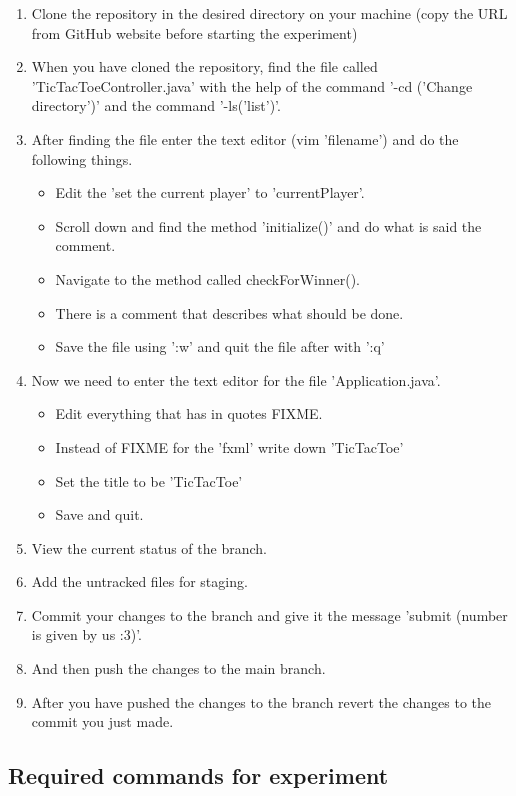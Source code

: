 \documentclass[]{report}
\begin{document}
	\begin{enumerate}[leftmargin=*]
		\item Clone the repository in the desired directory on your machine (copy the URL from GitHub website before starting the experiment)
		\item When you have cloned the repository, find the file called 'TicTacToeController.java' with the help of the command '-cd ('Change directory')' and the command '-ls('list')'.
		\item After finding the file enter the text editor (vim 'filename') and do the following things.
				\begin{itemize}
					\item Edit the 'set the current player' to 'currentPlayer'.
					\item Scroll down and find the method 'initialize()' and do what is said the comment.
					\item Navigate to the method called checkForWinner().
					\item There is a comment that describes what should be done.
					\item Save the file using ':w' and quit the file after with ':q'
				\end{itemize}
			\item Now we need to enter the text editor for the file 'Application.java'.
			\begin{itemize}
				\item Edit everything that has in quotes FIXME.
				\item Instead of FIXME for the 'fxml' write down 'TicTacToe'
				\item Set the title to be 'TicTacToe'
				\item Save and quit.
			\end{itemize}
		\item View the current status of the branch.
		\item Add the untracked files for staging.
		\item Commit your changes to the branch and give it the message 'submit (number is given by us :3)'.
		\item And then push the changes to the main branch.
		\item After you have pushed the changes to the branch revert the changes to the commit you just made.
	\end{enumerate}
	
	\subsection{Required commands for experiment}
		\label{appendix: Experiment commands}
	
\end{document}
